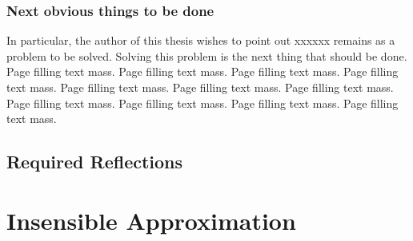 \documentclass[12pt,a4paper,twoside,openright]{book}
\begin{document}
\subsection{Next obvious things to be done}

In particular, the author of this thesis wishes to point out xxxxxx remains as
a problem to be solved. Solving this problem is the next thing that should be
done. Page filling text mass. Page filling text mass. Page filling text
mass. Page filling text mass. Page filling text mass. Page filling text
mass. Page filling text mass. Page filling text mass. Page filling text
mass. Page filling text mass. Page filling text mass.

\section{Required Reflections}
\label{sec:req-reflections}




\appendix
\chapter{Insensible Approximation}

\backmatter
\end{document}
